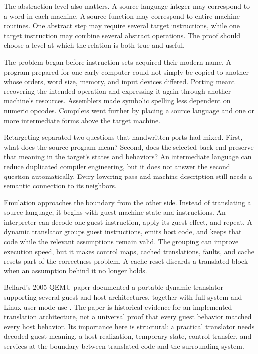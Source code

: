 The abstraction level also matters. A source-language integer may correspond
to a word in each machine. A source function may correspond to entire machine
routines. One abstract step may require several target instructions, while one
target instruction may combine several abstract operations. The proof should
choose a level at which the relation is both true and useful.

The problem began before instruction sets acquired their modern name. A
program prepared for one early computer could not simply be copied to another
whose orders, word size, memory, and input devices differed. Porting meant
recovering the intended operation and expressing it again through another
machine's resources. Assemblers made symbolic spelling less dependent on
numeric opcodes. Compilers went further by placing a source language and one
or more intermediate forms above the target machine.

Retargeting separated two questions that handwritten ports had mixed. First,
what does the source program mean? Second, does the selected back end preserve
that meaning in the target's states and behaviors? An intermediate language
can reduce duplicated compiler engineering, but it does not answer the second
question automatically. Every lowering pass and machine description still
needs a semantic connection to its neighbors.

Emulation approaches the boundary from the other side. Instead of translating
a source language, it begins with guest-machine state and instructions. An
interpreter can decode one guest instruction, apply its guest effect, and
repeat. A dynamic translator groups guest instructions, emits host code, and
keeps that code while the relevant assumptions remain valid. The grouping
can improve execution speed, but it makes control maps, cached translations,
faults, and cache resets part of the correctness problem. A cache reset
discards a translated block when an assumption behind it no longer holds.

Bellard's 2005 QEMU paper documented a portable dynamic translator supporting
several guest and host architectures, together with full-system and Linux
user-mode use \autocite{bellard2005qemu}. The paper is historical evidence for
an implemented translation architecture, not a universal proof that every
guest behavior matched every host behavior. Its importance here is structural:
a practical translator needs decoded guest meaning, a host realization,
temporary state, control transfer, and services at the boundary between
translated code and the surrounding system.

